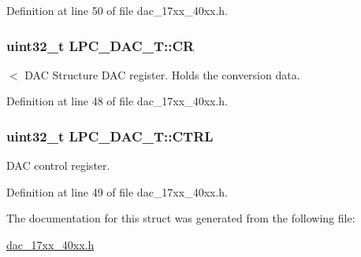 Definition at line 50 of file dac\+\_\+17xx\+\_\+40xx.\+h.

\subsubsection[{\texorpdfstring{CR}{CR}}]{ uint32\+\_\+t L\+P\+C\+\_\+\+D\+A\+C\+\_\+\+T\+::\+CR}\hypertarget{structLPC__DAC__T_a9e9bbab757da4f3ef793da168224eb9d}{}\label{structLPC__DAC__T_a9e9bbab757da4f3ef793da168224eb9d}
$<$ D\+AC Structure D\+AC register. Holds the conversion data. 

Definition at line 48 of file dac\+\_\+17xx\+\_\+40xx.\+h.

\subsubsection[{\texorpdfstring{C\+T\+RL}{CTRL}}]{ uint32\+\_\+t L\+P\+C\+\_\+\+D\+A\+C\+\_\+\+T\+::\+C\+T\+RL}\hypertarget{structLPC__DAC__T_a602c1a7a50c8372683c0eef978e2c149}{}\label{structLPC__DAC__T_a602c1a7a50c8372683c0eef978e2c149}
D\+AC control register. 

Definition at line 49 of file dac\+\_\+17xx\+\_\+40xx.\+h.



The documentation for this struct was generated from the following file\+:\begin{DoxyCompactItemize}
\item 
\hyperlink{dac__17xx__40xx_8h}{dac\+\_\+17xx\+\_\+40xx.\+h}\end{DoxyCompactItemize}
